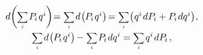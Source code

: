 \nopagebreak\vspace{-0.4em}
\begin{equation*}
\begin{array}{c}
d \biggl( \hspace{-0.1ex} \scalebox{.8}{$\displaystyle \sum_{\smash{i}}$} \hspace{.2ex} P_{\hspace{-0.1ex}i} \hspace{.2ex} q^i \hspace{-0.12ex} \biggr) \hspace{-0.5ex}
= \scalebox{.8}{$\displaystyle \sum_{\smash{i}}$} \hspace{.25ex} d \hspace{-0.25ex} \left( \hspace{-0.1ex} P_{\hspace{-0.1ex}i} \hspace{.2ex} q^i \right) \hspace{-0.3ex}
= \scalebox{.8}{$\displaystyle \sum_{\smash{i}}$} \hspace{-0.3ex} \left( \hspace{.1ex}
q^i \hspace{.2ex} d P_{\hspace{-0.1ex}i}
+ P_{\hspace{-0.1ex}i} \hspace{.2ex} dq^i \right)
\hspace{-0.3ex} ,
\\[1em]
%
\scalebox{.8}{$\displaystyle \sum_{\smash{i}}$} \hspace{.25ex} d \hspace{-0.25ex} \left( \hspace{-0.1ex} P_{\hspace{-0.1ex}i} \hspace{.2ex} q^i \right) \hspace{-0.2ex}
- \hspace{.1ex} \tikzmark{beginDifferentialOfPotentialEnergy} \scalebox{.8}{$\displaystyle \sum_{\smash{i}}$} \hspace{.2ex} P_{\hspace{-0.1ex}i} \hspace{.2ex} dq^i \tikzmark{endDifferentialOfPotentialEnergy}
= \scalebox{.8}{$\displaystyle \sum_{\smash{i}}$} \hspace{.32ex} q^i \hspace{.2ex} dP_{\hspace{-0.1ex}i}
\hspace{.3ex} ,
\\[1.6em]

\end{array}
\end{equation*}
